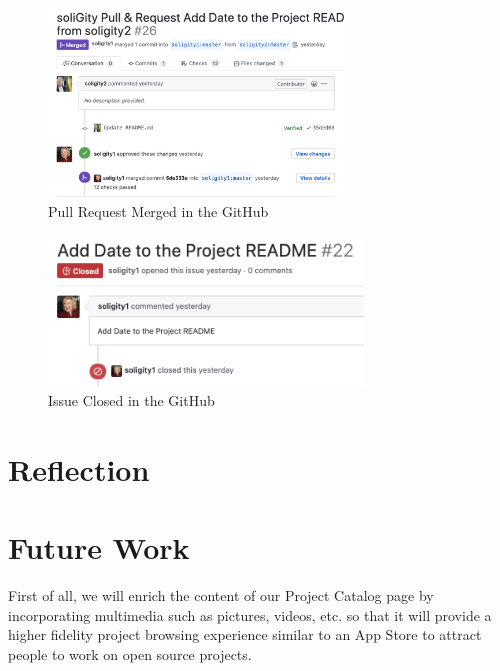 \documentclass[12pt]{article}
\renewcommand{\_}{\kern-1.5pt\textunderscore\kern-1.5pt}
\begin{document}


\begin{figure}[H]
	\centering
	\includegraphics[height=5cm]{graphs/44. pull_request_closed}
	\caption{Pull Request Merged in the GitHub}
\end{figure}

\begin{figure}[H]
	\centering
	\includegraphics[height=4cm]{graphs/45. issue_closed}
	\caption{Issue Closed in the GitHub}
\end{figure}


\renewcommand\thesection{\arabic{section}}
\renewcommand\thesubsection{\thesection.\arabic{subsection}}

\section{Reflection}


\section{Future Work}
First of all, we will enrich the content of our Project Catalog page by incorporating multimedia such as pictures, videos, etc. so that it will provide a higher fidelity project browsing experience similar to an App Store to attract people to work on open source projects.
\end{document}
